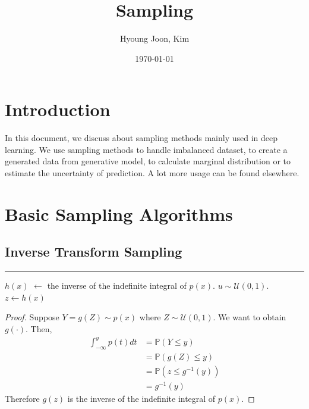 \documentclass{article}
\title{Sampling}
\author{Hyoung Joon, Kim}
\date{\today}
\begin{document}
\maketitle
\tableofcontents
\newpage

\section{Introduction}
    In this document, we discuss about sampling methods mainly used in deep learning. We use sampling methods
    to handle imbalanced dataset, to create a generated data from generative model, to calculate marginal distribution
    or to estimate the uncertainty of prediction. A lot more usage can be found elsewhere. 

\section{Basic Sampling Algorithms}
    \subsection{Inverse Transform Sampling}
        \begin{algorithm}[H]
            \DontPrintSemicolon
            \caption{Inverse transform sampling algorithm}
            

            \BlankLine
            \hrule

            $h(x)$ $\leftarrow$ the inverse of the indefinite integral of $p(x)$.\;
            $u \sim \mathcal U(0,1)$.\;
            $z \leftarrow h(x)$

        \end{algorithm}

        \begin{proof}
            Suppose $Y=g(Z) \sim p(x)$ where $Z \sim \mathcal U(0,1)$. We want to obtain $g(\cdot)$.
            Then, 
            \begin{align*}
                \int_{-\infty}^{y} p(t)dt &= \mathbb P(Y \leq y)  \\
                &= \mathbb P(g(Z) \leq y) \\
                &= \mathbb P(z \leq g^{-1}(y)) \\
                &= g^{-1}(y)
            \end{align*}
            Therefore $g(z)$ is the inverse of the indefinite integral of $p(x)$. 
        \end{proof}
\end{document}
